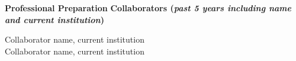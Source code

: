 \documentclass[11pt,letterpaper,english]{article}
\begin{document}
\begin{flushleft} {\bf Professional Preparation}
\vspace{-6pt}
{\bf Collaborators ({\emph{past 5 years including name and current institution}})} 
{\parindent 16pt


Collaborator name, current institution \\
Collaborator name, current institution \\
}


\end{flushleft}
\end{document}
